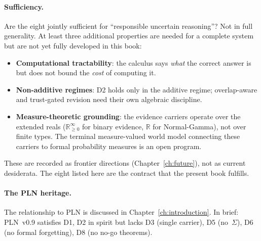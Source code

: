 \documentclass[11pt,openany]{report}
\begin{document}
\paragraph{Sufficiency.}
Are the eight jointly sufficient for ``responsible uncertain
reasoning''?  Not in full generality.  At least three additional
properties are needed for a complete system but are not yet fully
developed in this book:
\begin{itemize}
\item \textbf{Computational tractability}: the calculus says
  \emph{what} the correct answer is but does not bound the
  \emph{cost} of computing it.
\item \textbf{Non-additive regimes}: D2 holds only in the additive
  regime; overlap-aware and trust-gated revision need their own
  algebraic discipline.
\item \textbf{Measure-theoretic grounding}: the evidence carriers
  operate over the extended reals ($\mathbb{R}_{\ge 0}^\infty$
  for binary evidence, $\mathbb{R}$ for Normal-Gamma), not
  over finite types.  The terminal measure-valued world model
  connecting these carriers to formal probability measures is an
  open program.
\end{itemize}
These are recorded as frontier directions (Chapter~\ref{ch:future}),
not as current desiderata.  The eight listed here are the contract
that the present book fulfills.

\paragraph{The PLN heritage.}
The relationship to PLN is discussed in
Chapter~\ref{ch:introduction}.  In brief: PLN~v0.9 satisfies D1,
D2 in spirit but lacks D3 (single carrier), D5 (no~$\Sigma$),
D6 (no formal forgetting), D8 (no no-go theorems).
\end{document}
